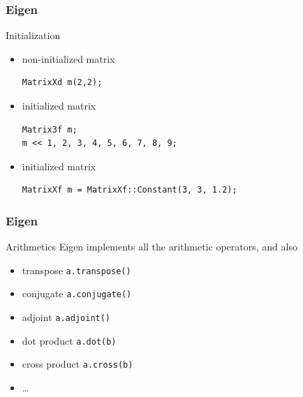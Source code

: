 \documentclass{beamer}
\newcommand{\cpp}[1]{\lstinline!#1!}
\begin{document}

\begin{frame}[fragile]

    \frametitle{Eigen}

    \begin{block}{Initialization}
        \begin{itemize}
            \item non-initialized matrix
            \begin{lstlisting}
MatrixXd m(2,2);
            \end{lstlisting}
            \item initialized matrix
            \begin{lstlisting}
Matrix3f m;
m << 1, 2, 3, 4, 5, 6, 7, 8, 9;
            \end{lstlisting}
            \item initialized matrix
            \begin{lstlisting}
MatrixXf m = MatrixXf::Constant(3, 3, 1.2);
            \end{lstlisting}
        \end{itemize}

    \end{block}

\end{frame}


\begin{frame}[fragile]

    \frametitle{Eigen}

    \begin{block}{Arithmetics}
        Eigen implements all the arithmetic operators, and also
        \begin{itemize}
            \item transpose \cpp{a.transpose()}
            \item conjugate \cpp{a.conjugate()}
            \item adjoint \cpp{a.adjoint()}
            \item dot product \cpp{a.dot(b)}
            \item cross product \cpp{a.cross(b)}
            \item \ldots
        \end{itemize}

    \end{block}

\end{frame}
\end{document}
